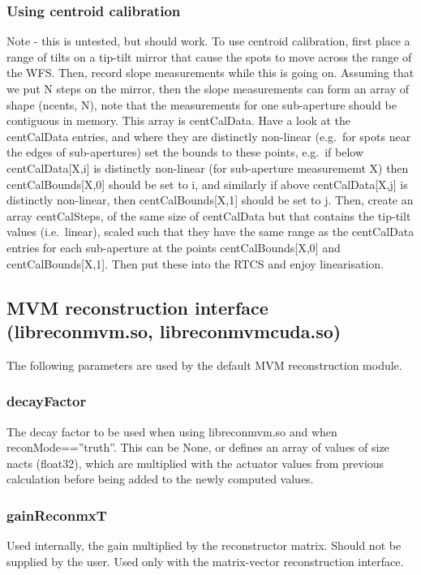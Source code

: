 \documentclass[a4,10pt]{article}
\begin{document}
\subsubsection{Using centroid calibration}
Note - this is untested, but should work.  To use centroid
calibration, first place a range of tilts on a tip-tilt mirror that
cause the spots to move across the range of the WFS.  Then, record
slope measurements while this is going on.  Assuming that we put N
steps on the mirror, then the slope measurements can form an array of
shape (ncents, N), note that the measurements for one sub-aperture
should be contiguous in memory.  This array is centCalData.  Have a
look at the centCalData entries, and where they are distinctly
non-linear (e.g.\ for spots near the edges of sub-apertures) set the
bounds to these points, e.g.\ if below centCalData[X,i] is distinctly
non-linear (for sub-aperture measurememt X) then centCalBounds[X,0]
should be set to i, and similarly if above centCalData[X,j] is
distinctly non-linear, then centCalBounds[X,1] should be set to j.
Then, create an array centCalSteps, of the same size of centCalData
but that contains the tip-tilt values (i.e.\ linear), scaled such that
they have the same range as the centCalData entries for each
sub-aperture at the points centCalBounds[X,0] and centCalBounds[X,1].
Then put these into the RTCS and enjoy linearisation.



\subsection{MVM reconstruction interface (libreconmvm.so,
  libreconmvmcuda.so)}
The following parameters are used by the default MVM reconstruction module.
\subsubsection{decayFactor}
The decay factor to be used when using libreconmvm.so and when
reconMode==''truth''.  This can be None, or defines an array of values
of size nacts (float32), which are multiplied with the actuator values from
previous calculation before being added to the newly computed values.

\subsubsection{gainReconmxT}
Used internally, the gain multiplied by the reconstructor matrix.
Should not be supplied by the user.  Used only with the matrix-vector
reconstruction interface.
\end{document}
